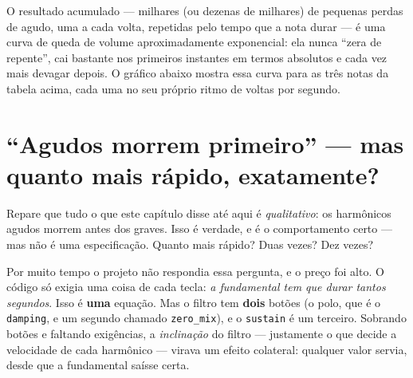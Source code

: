 \documentclass[11pt,oneside]{book}
\begin{document}
O resultado acumulado --- milhares (ou dezenas de milhares) de pequenas
perdas de agudo, uma a cada volta, repetidas pelo tempo que a nota durar
--- é uma curva de queda de volume aproximadamente exponencial: ela nunca
\enquote{zera de repente}, cai bastante nos primeiros instantes em termos
absolutos e cada vez mais devagar depois. O gráfico abaixo mostra essa
curva para as três notas da tabela acima, cada uma no seu próprio ritmo de
voltas por segundo.

\begin{center}
\end{center}

\section*{\enquote{Agudos morrem primeiro} --- mas quanto mais rápido,
exatamente?}

Repare que tudo o que este capítulo disse até aqui é \emph{qualitativo}: os
harmônicos agudos morrem antes dos graves. Isso é verdade, e é o
comportamento certo --- mas não é uma especificação. Quanto mais rápido?
Duas vezes? Dez vezes?

Por muito tempo o projeto não respondia essa pergunta, e o preço foi alto. O
código só exigia uma coisa de cada tecla: \emph{a fundamental tem que durar
tantos segundos}. Isso é \textbf{uma} equação. Mas o filtro tem
\textbf{dois} botões (o polo, que é o \texttt{damping}, e um segundo
chamado \texttt{zero\_mix}), e o \texttt{sustain} é um terceiro. Sobrando
botões e faltando exigências, a \emph{inclinação} do filtro --- justamente o
que decide a velocidade de cada harmônico --- virava um efeito colateral:
qualquer valor servia, desde que a fundamental saísse certa.
\end{document}
